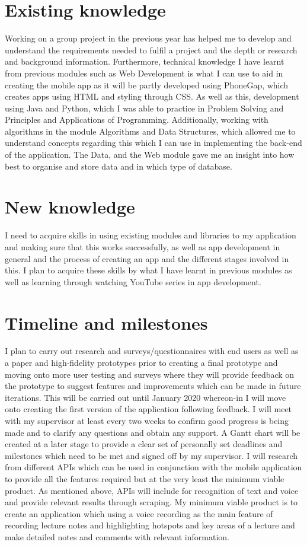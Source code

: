 \documentclass{report}
\begin{document}
\section{Existing knowledge}
	Working on a group project in the previous year has helped me to develop and understand the requirements needed to fulfil a project and the depth or research and background information. Furthermore, technical knowledge I have learnt from previous modules such as Web Development is what I can use to aid in creating the mobile app as it will be partly developed using PhoneGap, which creates apps using HTML and styling through CSS. As well as this, development using Java and Python, which I was able to practice in Problem Solving and Principles and Applications of Programming. Additionally, working with algorithms in the module Algorithms and Data Structures, which allowed me to understand concepts regarding this which I can use in implementing the back-end of the application. The Data, and the Web module gave me an insight into how best to organise and store data and in which type of database.

\section{New knowledge}
	I need to acquire skills in using existing modules and libraries to my application and making sure that this works successfully, as well as app development in general and the process of creating an app and the different stages involved in this.
	I plan to acquire these skills by what I have learnt in previous modules as well as learning through watching YouTube series in app development.

\section{Timeline and milestones}
I plan to carry out research and surveys/questionnaires with end users as well as a paper and high-fidelity prototypes prior to creating a final prototype and moving onto more user testing and surveys where they will provide feedback on the prototype to suggest features and improvements which can be made in future iterations. This will be carried out until January 2020 whereon-in I will move onto creating the first version of the application following feedback. I will meet with my supervisor at least every two weeks to confirm good progress is being made and to clarify any questions and obtain any support. A Gantt chart will be created at a later stage to provide a clear set of personally set deadlines and milestones which need to be met and signed off by my supervisor.
	I will research from different APIs which can be used in conjunction with the mobile application to provide all the features required but at the very least the minimum viable product. As mentioned above, APIs will include for recognition of text and voice and provide relevant results through scraping.
	My minimum viable product is to create an application which using a voice recording as the main feature of recording lecture notes and highlighting hotspots and key areas of a lecture and make detailed notes and comments with relevant information.	
\end{document}
